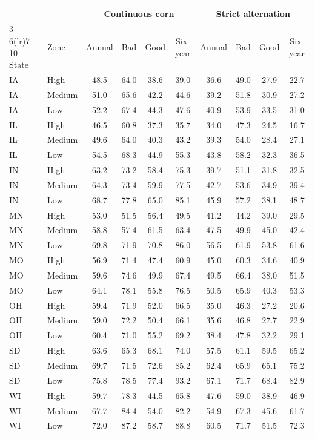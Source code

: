 \begin{tabular}{llcccccccc}
\toprule
 & & \multicolumn{4}{c}{Continuous corn} & \multicolumn{4}{c}{Strict alternation}\\
\cmidrule(lr){3-6}\cmidrule(lr){7-10}
State & Zone & Annual & Bad & Good & Six-year & Annual & Bad & Good & Six-year\\
\midrule
IA & High & 48.5 & 64.0 & 38.6 & 39.0 & 36.6 & 49.0 & 27.9 & 22.7 \\
IA & Medium & 51.0 & 65.6 & 42.2 & 44.6 & 39.2 & 51.8 & 30.9 & 27.2 \\
IA & Low & 52.2 & 67.4 & 44.3 & 47.6 & 40.9 & 53.9 & 33.5 & 31.0 \\
\addlinespace
IL & High & 46.5 & 60.8 & 37.3 & 35.7 & 34.0 & 47.3 & 24.5 & 16.7 \\
IL & Medium & 49.6 & 64.0 & 40.3 & 43.2 & 39.3 & 54.0 & 28.4 & 27.1 \\
IL & Low & 54.5 & 68.3 & 44.9 & 55.3 & 43.8 & 58.2 & 32.3 & 36.5 \\
\addlinespace
IN & High & 63.2 & 73.2 & 58.4 & 75.3 & 39.7 & 51.1 & 31.8 & 32.5 \\
IN & Medium & 64.3 & 73.4 & 59.9 & 77.5 & 42.7 & 53.6 & 34.9 & 39.4 \\
IN & Low & 68.7 & 77.8 & 65.0 & 85.1 & 45.9 & 57.2 & 38.1 & 48.7 \\
\addlinespace
MN & High & 53.0 & 51.5 & 56.4 & 49.5 & 41.2 & 44.2 & 39.0 & 29.5 \\
MN & Medium & 58.8 & 57.4 & 61.5 & 63.4 & 47.5 & 49.9 & 45.0 & 42.4 \\
MN & Low & 69.8 & 71.9 & 70.8 & 86.0 & 56.5 & 61.9 & 53.8 & 61.6 \\
\addlinespace
MO & High & 56.9 & 71.4 & 47.4 & 60.9 & 45.0 & 60.3 & 34.6 & 40.9 \\
MO & Medium & 59.6 & 74.6 & 49.9 & 67.4 & 49.5 & 66.4 & 38.0 & 51.5 \\
MO & Low & 64.1 & 78.1 & 55.8 & 76.5 & 50.5 & 65.9 & 40.3 & 53.3 \\
\addlinespace
OH & High & 59.4 & 71.9 & 52.0 & 66.5 & 35.0 & 46.3 & 27.2 & 20.6 \\
OH & Medium & 59.0 & 72.2 & 50.4 & 66.1 & 35.6 & 46.8 & 27.7 & 22.9 \\
OH & Low & 60.4 & 71.0 & 55.2 & 69.2 & 38.4 & 47.8 & 32.2 & 29.1 \\
\addlinespace
SD & High & 63.6 & 65.3 & 68.1 & 74.0 & 57.5 & 61.1 & 59.5 & 65.2 \\
SD & Medium & 69.7 & 71.5 & 72.6 & 85.2 & 62.4 & 65.9 & 65.1 & 75.2 \\
SD & Low & 75.8 & 78.5 & 77.4 & 93.2 & 67.1 & 71.7 & 68.4 & 82.9 \\
\addlinespace
WI & High & 59.7 & 78.3 & 44.5 & 65.8 & 47.6 & 59.0 & 38.9 & 46.9 \\
WI & Medium & 67.7 & 84.4 & 54.0 & 82.2 & 54.9 & 67.3 & 45.6 & 61.7 \\
WI & Low & 72.0 & 87.2 & 58.7 & 88.8 & 60.5 & 71.7 & 51.5 & 72.3 \\
\bottomrule
\end{tabular}

